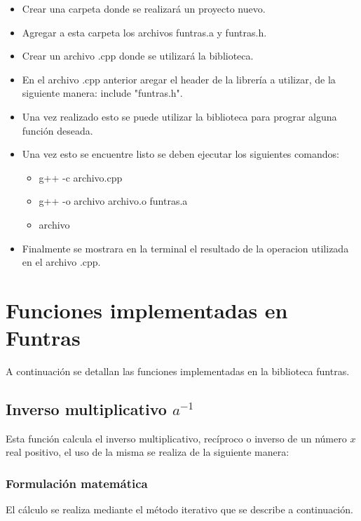 \documentclass[10pt,a4paper]{article}
\begin{document}
	\begin{itemize}
		\item Crear una carpeta donde se realizará un proyecto nuevo.
		\item Agregar a esta carpeta los archivos funtras.a y funtras.h.
		\item Crear un archivo .cpp donde se utilizará la biblioteca.
		\item En el archivo .cpp anterior aregar el header de la librería a utilizar, de la siguiente manera: include "funtras.h".
		\item Una vez realizado esto se puede utilizar la biblioteca para prograr alguna función deseada.
		\item Una vez esto se encuentre listo se deben ejecutar los siguientes comandos:
		\begin{itemize}
			\item g++ -c archivo.cpp
			\item g++ -o archivo archivo.o funtras.a
			\item archivo
		\end{itemize}
		\item Finalmente se mostrara en la terminal el resultado de la operacion utilizada en el archivo .cpp.
	\end{itemize}
		
		
	\section{Funciones implementadas en Funtras}
	A continuación se detallan las funciones implementadas en la biblioteca funtras.
	
	\subsection{Inverso multiplicativo $a^{-1}$}
	
	Esta función calcula el inverso multiplicativo, recíproco o inverso de un número $x$ real positivo, el uso de la misma se realiza de la siguiente manera:
	
	\begin{center}
	\end{center}
	
	\subsubsection{Formulación matemática}
	
	El cálculo se realiza mediante el método iterativo que se describe a continuación.
	
\end{document}
